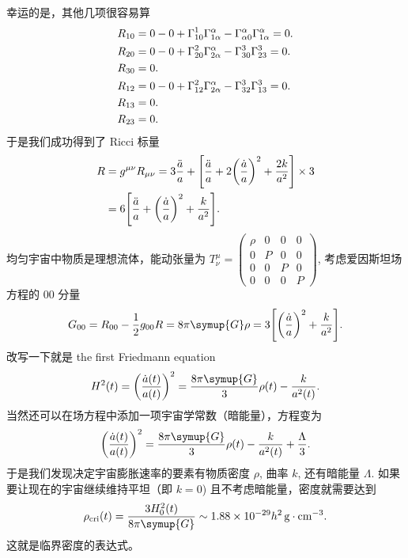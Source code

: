 \documentclass[../天体物理基础.tex]{subfiles}
\begin{document}
幸运的是，其他几项很容易算
\begin{align}
R_{10}&=0-0+\Gamma_{10}^{1}\Gamma_{1\alpha}^{\alpha}-\Gamma_{\alpha0}^{\alpha}\Gamma_{1\alpha}^{\alpha}=0.\notag\\
R_{20}&=0-0+\Gamma_{20}^{2}\Gamma_{2\alpha}^{\alpha}-\Gamma_{30}^{3}\Gamma_{23}^{3}=0.\notag\\
R_{30}&=0.\notag\\
R_{12}&=0-0+\Gamma_{12}^{2}\Gamma_{2\alpha}^{\alpha}-\Gamma_{32}^{3}\Gamma_{13}^{3}=0.\notag\\
R_{13}&=0.\notag\\
R_{23}&=0.\notag
\end{align}
于是我们成功得到了 Ricci 标量
\begin{align}
R&=g^{\mu\nu}R_{\mu\nu}=3\frac{\ddot a}{a}+\mleft[\frac{\ddot a}{a}+2\mleft(\frac{\dot a}{a}\mright)^{2}+\frac{2k}{a^{2}}\mright]\times3\notag\\
&=6\mleft[\frac{\ddot a}{a}+\mleft(\frac{\dot a}{a}\mright)^{2}+\frac{k}{a^{2}}\mright].\notag
\end{align}
均匀宇宙中物质是理想流体，能动张量为 $T^{\mu}_{\nu}=\begin{pmatrix}
\rho & 0 & 0 & 0\\
0 & P & 0 & 0\\
0 & 0 & P & 0\\
0 & 0 & 0 & P
\end{pmatrix}$, 考虑爱因斯坦场方程的 00 分量
\begin{equation}
G_{00}=R_{00}-\frac{1}{2}g_{00}R=8\pi\symup{G}\rho=3\mleft[\mleft(\frac{\dot a}{a}\mright)^{2}+\frac{k}{a^{2}}\mright].\notag
\end{equation}
改写一下就是 the first Friedmann equation
\begin{equation}
H^{2}\mleft(t\mright)=\mleft(\frac{\dot{a}\mleft(t\mright)}{a\mleft(t\mright)}\mright)^{2}=\frac{8\pi\symup{G}}{3}\rho\mleft(t\mright)-\frac{k}{a^{2}\mleft(t\mright)}.
\end{equation}
当然还可以在场方程中添加一项宇宙学常数（暗能量），方程变为
\begin{equation}
\mleft(\frac{\dot{a}\mleft(t\mright)}{a\mleft(t\mright)}\mright)^{2}=\frac{8\pi\symup{G}}{3}\rho\mleft(t\mright)-\frac{k}{a^{2}\mleft(t\mright)}+\frac{\Lambda}{3}.\label{1.6.8}
\end{equation}
于是我们发现决定宇宙膨胀速率的要素有物质密度 $\rho$, 曲率 $k$, 还有暗能量 $\Lambda$. 如果要让现在的宇宙继续维持平坦（即 $k=0$) 且不考虑暗能量，密度就需要达到
\begin{equation}
\rho_{\mathrm{cri}}\mleft(t\mright)=\frac{3H_{0}^{2}\mleft(t\mright)}{8\pi\symup{G}}\sim1.88\times10^{-29}h^{2}\,\unit{g\cdot{}cm^{-3}}.
\end{equation}
这就是临界密度的表达式。
\end{document}
